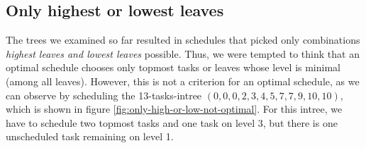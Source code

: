 \subsection{Only highest or lowest leaves}
\label{sec:disproving-only-highest-or-lowest-leaves}

The trees we examined so far resulted in schedules that picked only combinations \emph{highest leaves and lowest leaves} possible. Thus, we were tempted to think that an optimal schedule chooses only topmost tasks or leaves whose level is minimal (among all leaves). However, this is not a criterion for an optimal schedule, as we can observe by scheduling the 13-tasks-intree $(0,0,0,2,3,4,5,7,7,9,10,10)$, which is shown in figure \ref{fig:only-high-or-low-not-optimal}. For this intree, we have to schedule two topmost tasks and one task on level 3, but there is one unscheduled task remaining on level 1.

